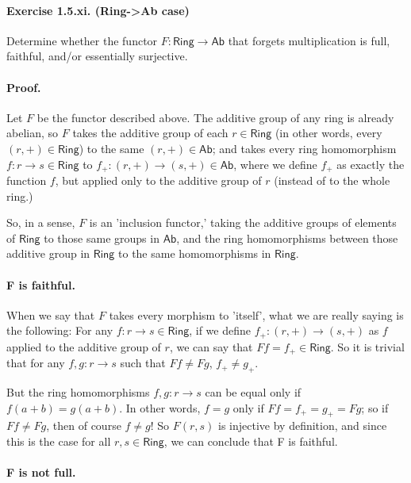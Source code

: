 \documentclass[english]{article}
\begin{document}
	\paragraph{Exercise 1.5.xi. (Ring->Ab case)} Determine whether the functor \(F \colon \textsf{Ring} \to \textsf{Ab}\) that forgets multiplication is full, faithful, and/or essentially surjective.
	
	\paragraph{Proof.} Let \(F\) be the functor described above. The additive group of any ring is already abelian, so \(F\)  takes the additive group of each \(r \in \textsf{Ring}\) (in other words, every \((r, +) \in \textsf{Ring}\)) to the same \((r, +) \in \textsf{Ab}\); and takes every ring homomorphism \(f \colon r \to s \in \textsf{Ring}\) to \(f_+ \colon (r, +) \to (s, +) \in \textsf{Ab}\),  where we define \(f_+\) as exactly the function \(f\), but applied only to the additive group of \(r\) (instead of to the whole ring.) 
	
	So, in a sense, \(F\) is an 'inclusion functor,' taking the additive groups of elements of \(\textsf{Ring}\) to those same groups in \(\textsf{Ab}\), and the ring homomorphisms between those additive group in \(\textsf{Ring}\) to the same homomorphisms in \(\textsf{Ring}\).
	
	\paragraph{F is faithful.}	
	
	When we say that \(F\) takes every morphism to 'itself', what we are really saying is the following: For any \(f \colon r \to s \in \textsf{Ring}\), if we define \(f_+ \colon (r, +) \to (s, +)\) as \(f\) applied to the additive group of \(r\), we can say that \(Ff = f_+\in \textsf{Ring}\). So it is trivial that for any \(f, g \colon r \to s\) such that \(Ff \neq Fg\), \(f_+ \neq g_+\). 

	But the ring homomorphisms \(f, g \colon r \to s\) can be equal only if \(f(a+b) = g(a+b)\). In other words, \(f = g \) only if \(Ff = f_+ = g_+ = Fg\); so if \(Ff \neq Fg\), then of course \(f \neq g \)! So \(F(r, s)\) is injective by definition, and since this is the case for all \(r, s \in \textsf{Ring}\), we can conclude that F is faithful.

	\paragraph{F is not full.}	
	
\end{document}
